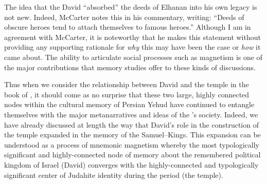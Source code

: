 The idea that the David ``absorbed'' the deeds of Elhanan into his own legacy is not new. Indeed, McCarter notes this in his commentary, writing: ``Deeds of obscure heroes tend to attach themselves to famous heroes.''\autocite[450]{mccarter1984} Although I am in agreement with McCarter, it is noteworthy that he makes this statement without providing any supporting rationale for \emph{why} this may have been the case or \emph{how} it came about. The ability to articulate social processes such as magnetism is one of the major contributions that memory studies offer to these kinds of discussions.

Thus when we consider the relationship between David and the temple in the book of \chronicles, it should come as no surprise that these two large, highly connected nodes within the cultural memory of Persian Yehud have continued to entangle themselves with the major metanarratives and ideas of the \chronicler's society. Indeed, we have already discussed at length the way that David's role in the construction of the temple expanded in the memory of the \chronicler \visavis Samuel--Kings. This expansion can be understood as a process of mnemonic magnetism whereby the most typologically significant and highly-connected node of memory about the remembered political kingdom of Israel (David) converges with the highly-connected and typologically significant center of Judahite identity during the \secondtemple period (the temple). 


